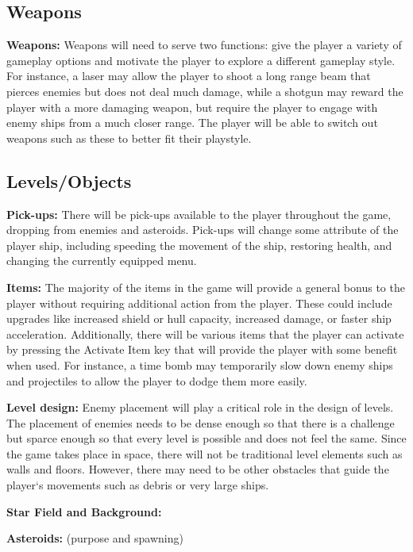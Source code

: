 \documentclass[12pt]{article}       %
\begin{document}
\subsection{Weapons} %

	{\bf Weapons:} Weapons will need to serve two functions: give the player a variety of gameplay options and motivate the player to explore a different gameplay style. For instance, a laser may allow the player to shoot a long range beam that pierces enemies but does not deal much damage, while a shotgun may reward the player with a more damaging weapon, but require the player to engage with enemy ships from a much closer range. The player will be able to switch out weapons such as these to better fit their playstyle.


\subsection{Levels/Objects} %

	{\bf Pick-ups:}  There will be pick-ups available to the player throughout the game, dropping from enemies and asteroids. Pick-ups will change some attribute of the player ship, including  speeding the movement of the ship, restoring health, and changing the currently equipped menu.

	{\bf  Items:} The majority of the items in the game will provide a general bonus to the player without requiring additional action from the player. These could include upgrades like increased shield or hull capacity, increased damage, or faster ship acceleration. Additionally, there will be various items that the player can activate by pressing the Activate Item key that will provide the player with some benefit when used. For instance, a time bomb may temporarily slow down enemy ships and projectiles to allow the player to dodge them more easily.

	{\bf Level design:} Enemy placement will play a critical role in the design of levels. The placement of enemies needs to be dense enough so that there is a challenge but  sparce enough so that every level is possible and does not feel the same. Since the game takes place in space, there will not be traditional level elements such as walls and floors. However, there may need to be other obstacles that guide the player‘s movements such as debris or very large ships.

	{\bf Star Field and Background:}

	{\bf Asteroids:} (purpose and spawning)
\end{document}

